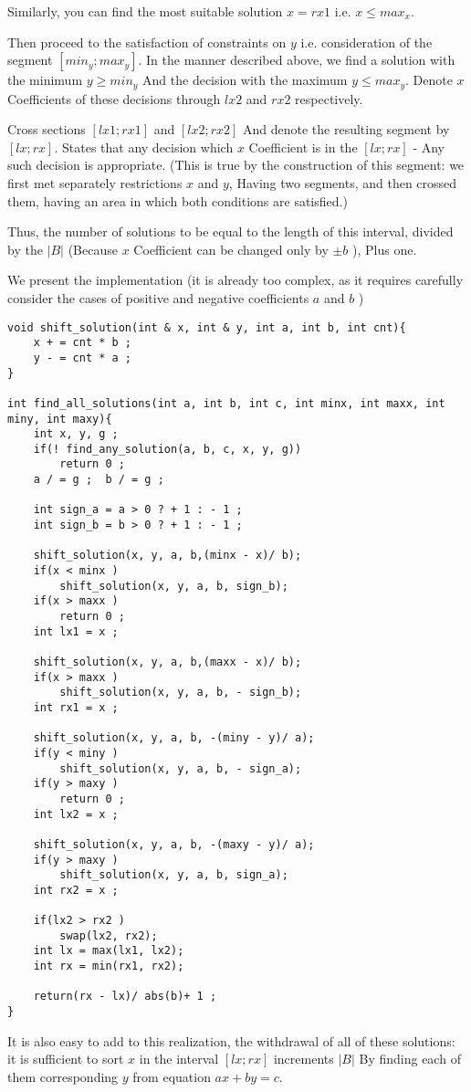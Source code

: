 Similarly, you can find the most suitable solution $x = rx1$ i.e. $x \le max_x$.

Then proceed to the satisfaction of constraints on $y$ i.e. consideration of the segment $[min_y; max_y]$. In the manner described above, we find a solution with the minimum $y \ge min_y$ And the decision with the maximum $y \le max_y$. Denote $x$ Coefficients of these decisions through $lx2$ and $rx2$ respectively.

Cross sections $[lx1; rx1]$ and $[lx2; rx2]$ And denote the resulting segment by $[lx; rx]$. States that any decision which $x$ Coefficient is in the $[lx; rx]$ - Any such decision is appropriate. (This is true by the construction of this segment: we first met separately restrictions $x$ and $y$, Having two segments, and then crossed them, having an area in which both conditions are satisfied.)

Thus, the number of solutions to be equal to the length of this interval, divided by the $| B |$ (Because $x$ Coefficient can be changed only by $\pm b$ ), Plus one.

We present the implementation (it is already too complex, as it requires carefully consider the cases of positive and negative coefficients $a$ and $b$ )

\begin{verbatim}
void shift_solution(int & x, int & y, int a, int b, int cnt){
    x + = cnt * b ;
    y - = cnt * a ;
}
 
int find_all_solutions(int a, int b, int c, int minx, int maxx, int miny, int maxy){
    int x, y, g ;
    if(! find_any_solution(a, b, c, x, y, g))
        return 0 ;
    a / = g ;  b / = g ;
 
    int sign_a = a > 0 ? + 1 : - 1 ;
    int sign_b = b > 0 ? + 1 : - 1 ;
 
    shift_solution(x, y, a, b,(minx - x)/ b);
    if(x < minx )
        shift_solution(x, y, a, b, sign_b);
    if(x > maxx )
        return 0 ;
    int lx1 = x ;
 
    shift_solution(x, y, a, b,(maxx - x)/ b);
    if(x > maxx )
        shift_solution(x, y, a, b, - sign_b);
    int rx1 = x ;
 
    shift_solution(x, y, a, b, -(miny - y)/ a);
    if(y < miny )
        shift_solution(x, y, a, b, - sign_a);
    if(y > maxy )
        return 0 ;
    int lx2 = x ;
 
    shift_solution(x, y, a, b, -(maxy - y)/ a);
    if(y > maxy )
        shift_solution(x, y, a, b, sign_a);
    int rx2 = x ;
 
    if(lx2 > rx2 )
        swap(lx2, rx2);
    int lx = max(lx1, lx2);
    int rx = min(rx1, rx2);
 
    return(rx - lx)/ abs(b)+ 1 ;
} 
\end{verbatim}
It is also easy to add to this realization, the withdrawal of all of these solutions: it is sufficient to sort $x$ in the interval $[lx; rx]$ increments $| B |$ By finding each of them corresponding $y$ from equation $ax + by = c$.

